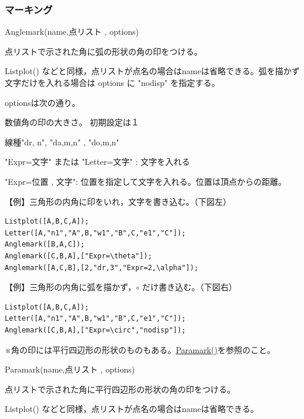 \documentclass[papersize,a4paper,10pt,uplatex]{jsarticle}
\begin{document}
\subsubsection{マーキング}
\begin{description}

\hypertarget{anglemark}{}
\item[関数]Anglemark(name,点リスト , options)
\item[機能]点リストで示された角に弧の形状の角の印をつける。
\item[説明]Listplot() などと同様，点リストが点名の場合はnameは省略できる。弧を描かず文字だけを入れる場合は options に "nodisp" を指定する。

optionsは次の通り。

数値角の印の大きさ。 初期設定は１

線種"dr, n", "da,m,n" , "do,m,n"

"Expr=文字" または "Letter=文字" : 文字を入れる

"Expr=位置 , 文字": 位置を指定して文字を入れる。位置は頂点からの距離。

\vspace{\baselineskip}
【例】三角形の内角に印をいれ，文字を書き込む。（下図左）
\begin{verbatim}
Listplot([A,B,C,A]);
Letter([A,"n1","A",B,"w1","B",C,"e1","C"]);
Anglemark([B,A,C]);
Anglemark([C,B,A],["Expr=\theta"]);
Anglemark([A,C,B],[2,"dr,3","Expr=2,\alpha"]);
\end{verbatim}

【例】三角形の内角に弧を描かず，$\circ$ だけ書き込む。（下図右）
\begin{verbatim}
Listplot([A,B,C,A]);
Letter([A,"n1","A",B,"w1","B",C,"e1","C"]);
Anglemark([C,B,A],["Expr=\circ","nodisp"]);
\end{verbatim}


\hspace{5mm}

※角の印には平行四辺形の形状のものもある。\hyperlink{paramark}{Paramark()}を参照のこと。

\vspace{\baselineskip}
\hypertarget{paramark}{}
\item[関数]Paramark(name,点リスト , options)
\item[機能]点リストで示された角に平行四辺形の形状の角の印をつける。
\item[説明]Listplot() などと同様，点リストが点名の場合はnameは省略できる。


\end{description}
\end{document}
